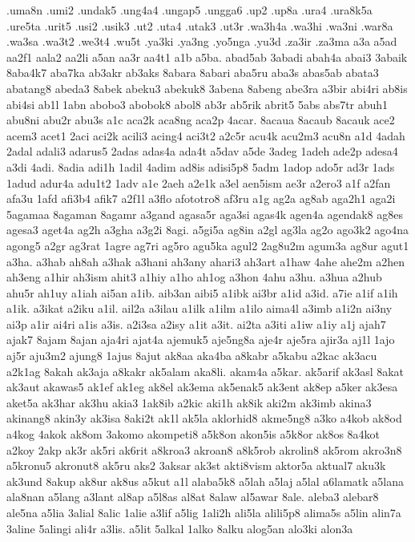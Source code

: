 {.uma8n .umi2 .undak5 .ung4a4 .ungap5 .ungga6 .up2 .up8a .ura4 .ura8k5a
.ure5ta .urit5 .usi2 .usik3 .ut2 .uta4 .utak3 .ut3r .wa3h4a .wa3hi .wa3ni
.war8a .wa3sa .wa3t2 .we3t4 .wu5t .ya3ki .ya3ng .yo5nga .yu3d .za3ir
.za3ma a3a a5ad aa2f1 aala2 aa2li a5an aa3r aa4t1 a1b a5ba. abad5ab 3abadi
abah4a abai3 3abaik 8aba4k7 aba7ka ab3akr ab3aks 8abara 8abari aba5ru
aba3s abas5ab abata3 abatang8 abeda3 8abek abeku3 abekuk8 3abena 8abeng
abe3ra a3bir abi4ri ab8is abi4si ab1l 1abn abobo3 abobok8 abol8 ab3r
ab5rik abrit5 5abs abs7tr abuh1 abu8ni abu2r abu3s a1c aca2k aca8ng aca2p
4acar. 8acaua 8acaub 8acauk ace2 acem3 acet1 2aci aci2k acili3 acing4
aci3t2 a2c5r acu4k acu2m3 acu8n a1d 4adah 2adal adali3 adarus5 2adas
adas4a ada4t a5dav a5de 3adeg 1adeh ade2p adesa4 a3di 4adi. 8adia adi1h
1adil 4adim ad8is adisi5p8 5adm 1adop ado5r ad3r 1ads 1adud adur4a adu1t2
1adv a1e 2aeh a2e1k a3el aen5ism ae3r a2ero3 a1f a2fan afa3u 1afd afi3b4
afik7 a2f1l a3flo afototro8 af3ru a1g ag2a ag8ab aga2h1 aga2i 5agamaa
8agaman 8agamr a3gand agasa5r aga3si agas4k agen4a agendak8 ag8es agesa3
aget4a ag2h a3gha a3g2i 8agi. a5gi5a ag8in a2gl ag3la ag2o ago3k2 ago4na
agong5 a2gr ag3rat 1agre ag7ri ag5ro agu5ka agul2 2ag8u2m agum3a ag8ur
agut1 a3ha. a3hab ah8ah a3hak a3hani ah3any ahari3 ah3art a1haw 4ahe ahe2m
a2hen ah3eng a1hir ah3ism ahit3 a1hiy a1ho ah1og a3hon 4ahu a3hu. a3hua
a2hub ahu5r ah1uy a1iah ai5an a1ib. aib3an aibi5 a1ibk ai3br a1id a3id.
a7ie a1if a1ih a1ik. a3ikat a2iku a1il. ail2a a3ilau a1ilk a1ilm a1ilo
aima4l a3imb a1i2n ai3ny ai3p a1ir ai4ri a1is a3is. a2i3sa a2isy a1it
a3it. ai2ta a3iti a1iw a1iy a1j ajah7 ajak7 8ajam 8ajan aja4ri ajat4a
ajemuk5 aje5ng8a aje4r aje5ra ajir3a aj1l 1ajo aj5r aju3m2 ajung8 1ajus
8ajut ak8aa aka4ba a8kabr a5kabu a2kac ak3acu a2k1ag 8akah ak3aja a8kakr
ak5alam aka8li. akam4a a5kar. ak5arif ak3asl 8akat ak3aut akawas5 ak1ef
ak1eg ak8el ak3ema ak5enak5 ak3ent ak8ep a5ker ak3esa aket5a ak3har ak3hu
akia3 1ak8ib a2kic aki1h ak8ik aki2m ak3imb akina3 akinang8 akin3y ak3isa
8aki2t ak1l ak5la aklorhid8 akme5ng8 a3ko a4kob ak8od a4kog 4akok ak8om
3akomo akompeti8 a5k8on akon5is a5k8or ak8os 8a4kot a2koy 2akp ak3r ak5ri
ak6rit a8kroa3 akroan8 a8k5rob akrolin8 ak5rom akro3n8 a5kronu5 akronut8
ak5ru aks2 3aksar ak3st akti8vism aktor5a aktual7 aku3k ak3und 8akup ak8ur
ak8us a5kut a1l alaba5k8 a5lah a5laj a5lal a6lamatk a5lana ala8nan a5lang
a3lant al8ap a5l8as al8at 8alaw al5awar 8ale. aleba3 alebar8 ale5na a5lia
3alial 8alic 1alie a3lif a5lig 1ali2h ali5la alili5p8 alima5s a5lin alin7a
3aline 5alingi ali4r a3lis. a5lit 5alkal 1alko 8alku alog5an alo3ki alon3a
}

